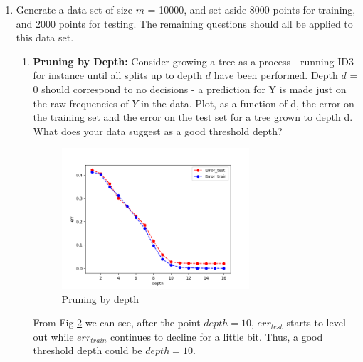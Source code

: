 \documentclass[letter, 12pt]{article}
\begin{document}
\begin{enumerate}
\begin{figure}[H]
	        \label{q2}
	        \caption{Average number of irrelevant variables that are included}
	    \end{figure}
    	\par{From Fig \ref{q2} we can see 10,000 data points is not enough to eliminate the effect of irrelevant variables (Avg. no. of irrelevant variables at $ m = 100,000 $ is 4.28). Because my inelegant implementation of ID3 algorithm, I don't have enough time to test cases where $ m > 100,000 $. But I assume we would need a huge amount of data points to eliminate the effect of irrelevant variables.}
        
        \item{Generate a data set of size $ m $ = 10000, and set aside 8000 points for training, and 2000 points for testing. The
        	remaining questions should all be applied to this data set.}
        \begin{enumerate}
        	\item {\textbf{Pruning by Depth:} Consider growing a tree as a process - running ID3 for instance until all splits
        		up to depth $ d $ have been performed. Depth $ d $ = 0 should correspond to no decisions - a prediction for Y
        		is made just on the raw frequencies of $ Y $ in the data. Plot, as a function of d, the error on the training
        		set and the error on the test set for a tree grown to depth d. What does your data suggest as a good
        		threshold depth?}
        	\begin{figure}[H]
        		\centering
        		\includegraphics[width=0.7\textwidth]{q3-1.png}
        		\caption{Pruning by depth}
        		\label{q31}
        	\end{figure}
        	\par{From Fig \ref{q31} we can see, after the point $ depth = 10 $, $ err_{test} $ starts to level out while $ err_{train} $ continues to decline for a little bit. Thus, a good threshold depth could be $ depth = 10. $}
        

\end{enumerate}
\end{enumerate}
\end{document}
